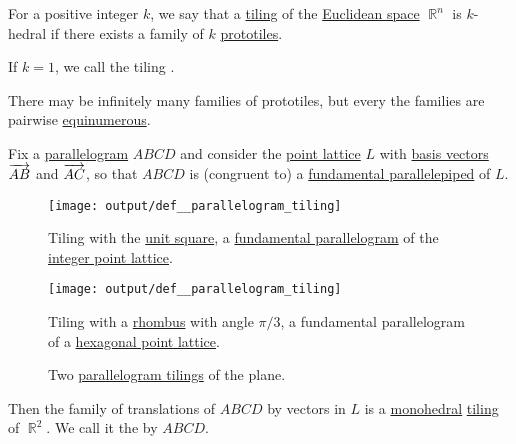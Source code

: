 \begin{definition}\label{def:k_hedral_tiling}
  For a positive integer \( k \), we say that a \hyperref[def:topological_space_tiling]{tiling} of the \hyperref[def:euclidean_space]{Euclidean space} \( \BbbR^n \) is \( k \)-hedral if there exists a family of \( k \) \hyperref[def:prototile]{prototiles}.

  If \( k = 1 \), we call the tiling .
\end{definition}
\begin{defproof}
  There may be infinitely many families of prototiles, but every the families are pairwise \hyperref[def:equinumerosity]{equinumerous}.
\end{defproof}

\begin{definition}\label{def:parallelogram_tiling}
  Fix a \hyperref[def:parallelogram]{parallelogram} \( ABCD \) and consider the \hyperref[def:point_lattice]{point lattice} \( L \) with \hyperref[def:point_lattice_basis]{basis vectors} \( \overrightarrow{AB} \) and \( \overrightarrow{AC} \), so that \( ABCD \) is (congruent to) a \hyperref[def:fundamental_paralellotope]{fundamental parallelepiped} of \( L \).

  \begin{figure}[!ht]
    \begin{subcaptionblock}{0.45\linewidth}
      \centering
      \texttt{[image: output/def\_\_parallelogram\_tiling]}
      \caption{Tiling with the \hyperref[def:unit_hypercube]{unit square}, a \hyperref[def:fundamental_paralellotope]{fundamental parallelogram} of the \hyperref[def:integer_point_lattice]{integer point lattice}.}\label{fig:def:parallelogram_tiling/square}
    \end{subcaptionblock}
    \hfill
    \begin{subcaptionblock}{0.45\linewidth}
      \centering
      \texttt{[image: output/def\_\_parallelogram\_tiling]}
      \caption{Tiling with a \hyperref[def:parallelogram/rhombus]{rhombus} with angle \( \pi / 3 \), a fundamental parallelogram of a \hyperref[def:hexagonal_point_lattice]{hexagonal point lattice}.}\label{fig:def:parallelogram_tiling/rhombus}
    \end{subcaptionblock}
    \caption{Two \hyperref[def:parallelogram_tiling]{parallelogram tilings} of the plane.}\label{fig:def:parallelogram_tiling}
  \end{figure}

  Then the family of translations of \( ABCD \) by vectors in \( L \) is a \hyperref[def:k_hedral_tiling]{monohedral} \hyperref[def:topological_space_tiling]{tiling} of \( \BbbR^2 \). We call it the  by \( ABCD \).
\end{definition}
